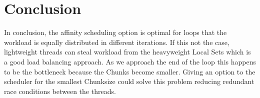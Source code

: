 \documentclass[12pt,a4paper]{article}
\newcommand{\sectionVspacing}{\vspace{15pt}}
\begin{document}
\sectionVspacing

\section{Conclusion}
In conclusion, the affinity scheduling option is optimal for loops that the workload is equally distributed in different iterations. If this not the case, lightweight threads can steal workload from the heavyweight Local Sets which is a good load balancing approach. As we approach the end of the loop this happens to be the bottleneck because the Chunks become smaller. Giving an option to the scheduler for the smallest Chunksize could solve this problem reducing redundant race conditions between the threads.
\end{document}
